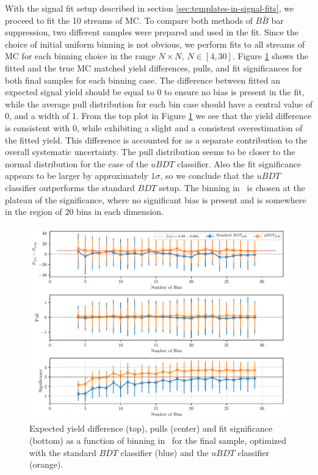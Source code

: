 With the signal fit setup described in section \ref{sec:templates-in-signal-fits}, we proceed to fit the 10 streams of MC. To compare both methods of $B \bar B$ bar suppression, two different samples were prepared and used in the fit. Since the choice of initial uniform binning is not obvious, we perform fits to all streams of MC for each binning choice in the range $N\times N,~N\in[4,30]$. Figure \ref{fig:sig_binning} shows the fitted and the true MC matched yield differences, pulls, and fit significances for both final samples for each binning case. The difference between fitted an expected signal yield should be equal to 0 to ensure no bias is present in the fit, while the average pull distribution for each bin case should have a central value of 0, and a width of 1. From the top plot in Figure \ref{fig:sig_binning} we see that the yield difference is consistent with 0, while exhibiting a slight and a consistent overestimation of the fitted yield. This difference is accounted for as a separate contribution to the overall systematic uncertainty. The pull distribution seems to be closer to the normal distribution for the case of the $uBDT$ classifier. Also the fit significance appears to be larger by approximately $1\sigma$, so we conclude that the $uBDT$ classifier outperforms the standard $BDT$ setup. The binning in \vars~is chosen at the plateau of the significance, where no significant bias is present and is somewhere in the region of $20$ bins in each dimension.

\begin{figure}[H]
	\centering
	\captionsetup{width=0.8\linewidth}
	\includegraphics[width=\linewidth]{fig/sig_binning}
	\caption{Expected yield difference (top), pulls (center) and fit significance (bottom) as a function of binning in \vars~for the final sample, optimized with the standard $BDT$ classifier (blue) and the $uBDT$ classifier (orange).}
	\label{fig:sig_binning}
\end{figure}

